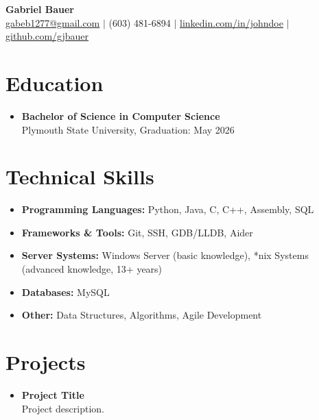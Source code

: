 \documentclass[11pt]{article}
\begin{document}
\begin{center}
    {\LARGE \textbf{Gabriel Bauer}} \\
    \vspace{0.1in}
    \href{mailto:gabeb1277@gmail.com}{gabeb1277@gmail.com} $\vert$ 
    (603) 481-6894 $\vert$ 
    \href{https://linkedin.com/in/johndoe}{linkedin.com/in/johndoe} $\vert$
    \href{https://github.com/gjbauer}{github.com/gjbauer}
\end{center}

\section*{Education}
\vspace{-0.1in}
\begin{itemize}[leftmargin=*]
    \item \textbf{Bachelor of Science in Computer Science} \\
    Plymouth State University, Graduation: May 2026 \\
\end{itemize}

\section*{Technical Skills}
\vspace{-0.1in}
\begin{itemize}[leftmargin=*]
    \item \textbf{Programming Languages:} Python, Java, C, C++, Assembly, SQL
    \item \textbf{Frameworks \& Tools:} Git, SSH, GDB/LLDB, Aider
    \item \textbf{Server Systems:} Windows Server (basic knowledge), *nix Systems (advanced knowledge, 13+ years)
    \item \textbf{Databases:} MySQL
    \item \textbf{Other:} Data Structures, Algorithms, Agile Development
\end{itemize}

\section*{Projects}
\vspace{-0.1in}
\begin{itemize}[leftmargin=*]
    \item \textbf{Project Title} \\
    Project description.
\end{itemize}
\end{document}
